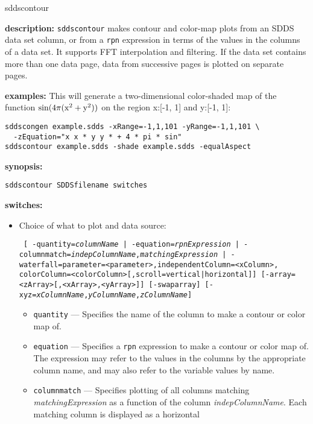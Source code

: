 \begin{sddsprog}{sddscontour}
  \item \textbf{description:}
  \verb|sddscontour| makes contour and color-map plots from an SDDS data set column, or from a \verb|rpn| expression
  in terms of the values in the columns of a data set. It supports FFT interpolation and filtering. If the
  data set contains more than one data page, data from successive pages is plotted on separate pages.

  \item \textbf{examples:}
  This will generate a two-dimensional color-shaded map of the function ${\rm sin(4\pi (x^2 + y^2))}$ on
  the region x:[-1, 1] and y:[-1, 1]:
  \begin{verbatim}
sddscongen example.sdds -xRange=-1,1,101 -yRange=-1,1,101 \
  -zEquation="x x * y y * + 4 * pi * sin"
sddscontour example.sdds -shade example.sdds -equalAspect
  \end{verbatim}
  \item \textbf{synopsis:}
  \begin{verbatim}
sddscontour SDDSfilename switches
  \end{verbatim}
  \item \textbf{switches:}
    \begin{itemize}
    \item Choice of what to plot and data source:
\begin{flushleft}{\tt
[{ -quantity={\em columnName} | -equation={\em rpnExpression} |
  -columnmatch={\em indepColumnName},{\em matchingExpression}} |
 -waterfall=parameter=<parameter>,independentColumn=<xColumn>,
             colorColumn=<colorColumn>[,scroll=vertical|horizontal]]
[-array=<zArray>[,<xArray>,<yArray>]] [-swaparray]
[-xyz={\em xColumnName},{\em yColumnName},{\em zColumnName}]
}\end{flushleft}
\begin{itemize}
        \item \verb|quantity| --- Specifies the name of the column to make a contour or color map of.
        \item \verb|equation| --- Specifies a \verb|rpn| expression to make a contour or color map of.
        The expression may refer to the values in the columns by the appropriate column name, and may
        also refer to the variable values by name.
        \item \verb|columnmatch| --- Specifies plotting of all columns matching {\em matchingExpression}
        as a function of the column {\em indepColumnName}.  Each matching column is displayed as a horizontal

\end{itemize}
\end{itemize}
\end{sddsprog}

